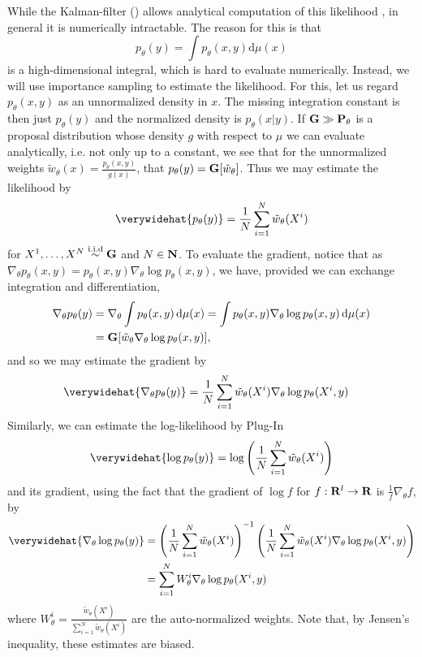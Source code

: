 While the Kalman-filter () allows analytical computation of this likelihood , in general  it is numerically intractable. The reason for this is that
$$
    p_{\theta}(y) = \int p_{\theta}(x,y) \mathrm d \mu(x)
$$
is a high-dimensional integral, which is hard to evaluate numerically. Instead, we will use importance sampling to estimate the likelihood. For this, let us regard $p_{\theta}(x,y)$ as an unnormalized density in $x$. The missing integration constant is then just $p_{\theta}(y)$ and the normalized density is $p_{\theta}(x|y)$. If $\mathbf G \gg \mathbf P_{\theta}$ is a proposal distribution whose density $g$ with respect to $\mu$ we can evaluate analytically, i.e. not only up to a constant, we see that for the unnormalized weights $\tilde w_{\theta}(x) = \frac{p_{\theta}(x,y)}{g(x)}$, that $p_{\theta}(y) = \mathbf G [\tilde w_{\theta}]$. Thus we may estimate the likelihood by 
$$
    \verywidehat{p_{\theta}(y)} = \frac{1}{N}\sum_{i = 1}^N \tilde w_{\theta} (X^{i})
$$
for $X^{1}, \dots, X^{N} \stackrel{\text{i.i.d}}{\sim} \mathbf G$ and $N \in \mathbf N$. To evaluate the gradient, notice that as $\nabla_{\theta} p_{\theta}(x,y) = p_{\theta}(x,y) \nabla_{\theta} \log p_{\theta}(x,y)$, we have, provided we can exchange integration and differentiation,
\begin{align*}
     \nabla_{\theta} p_{\theta}(y) &= \nabla_{\theta}\int p_{\theta}(x,y)\,\mathrm d \mu(x) = \int p_{\theta}(x,y) \nabla_{\theta} \log p_{\theta}(x,y)\,\mathrm d \mu(x) \\
     &= \mathbf G [\tilde w_{\theta} \nabla_{\theta} \log p_{\theta}(x,y)],
\end{align*}
and so we may estimate the gradient by 
\begin{align*}
    \verywidehat{\nabla_{\theta} p_{\theta}(y)} &= \frac{1}{N}\sum_{i = 1}^N \tilde w_{\theta}(X^{i}) \nabla_{\theta} \log p_{\theta}(X^{i}, y)
\end{align*}
Similarly, we can estimate the log-likelihood by Plug-In
\begin{align}
    \label{eq:loglik-hat-standard}
    \verywidehat{\log p_{\theta}(y)} = \log \left( \frac{1}{N}\sum_{i = 1}^N \tilde w_{\theta}(X^{i}) \right)
\end{align}
and its gradient, using the fact that the gradient of $\log f$ for $f: \mathbf R^{l} \to \mathbf R$ is $ \frac{1}{f} \nabla_{\theta} f$, by 
\begin{align*}
    \verywidehat{\nabla_{\theta} \log p_{\theta}(y)} &= \left(\frac{1}{N} \sum_{i = 1}^N \tilde w_{\theta}(X^{i}) \right)^{-1} \left( \frac{1}{N}\sum_{i = 1}^N \tilde w_{\theta}(X^{i}) \nabla_{\theta} \log p_{\theta}(X^{i}, y) \right) \\
    &=\sum_{i = 1}^N W_{\theta}^{i} \nabla_{\theta} \log p_{\theta}(X^{i}, y)
\end{align*}
where $W_{\theta}^{i} = \frac{\tilde w_{\theta}(X^{i})}{\sum_{i= 1}^N \tilde w_{\theta}(X^{i})}$ are the auto-normalized weights.
Note that, by Jensen's inequality, these estimates are biased.


